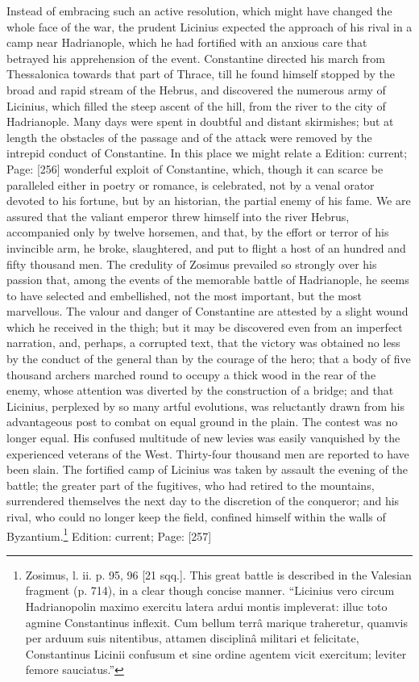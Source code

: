 Instead of embracing such an active resolution, which might have changed the whole face of the war, the prudent Licinius expected the approach of his rival in a camp near Hadrianople, which he had fortified with an anxious care that betrayed his apprehension of the event. Constantine directed his march from Thessalonica towards that part of Thrace, till he found himself stopped by the broad and rapid stream of the Hebrus, and discovered the numerous army of Licinius, which filled the steep ascent of the hill, from the river to the city of Hadrianople. Many days were spent in doubtful and distant skirmishes; but at length the obstacles of the passage and of the attack were removed by the intrepid conduct of Constantine. In this place we might relate a Edition: current; Page: [256] wonderful exploit of Constantine, which, though it can scarce be paralleled either in poetry or romance, is celebrated, not by a venal orator devoted to his fortune, but by an historian, the partial enemy of his fame. We are assured that the valiant emperor threw himself into the river Hebrus, accompanied only by twelve horsemen, and that, by the effort or terror of his invincible arm, he broke, slaughtered, and put to flight a host of an hundred and fifty thousand men. The credulity of Zosimus prevailed so strongly over his passion that, among the events of the memorable battle of Hadrianople, he seems to have selected and embellished, not the most important, but the most marvellous. The valour and danger of Constantine are attested by a slight wound which he received in the thigh; but it may be discovered even from an imperfect narration, and, perhaps, a corrupted text, that the victory was obtained no less by the conduct of the general than by the courage of the hero; that a body of five thousand archers marched round to occupy a thick wood in the rear of the enemy, whose attention was diverted by the construction of a bridge; and that Licinius, perplexed by so many artful evolutions, was reluctantly drawn from his advantageous post to combat on equal ground in the plain. The contest was no longer equal. His confused multitude of new levies was easily vanquished by the experienced veterans of the West. Thirty-four thousand men are reported to have been slain. The fortified camp of Licinius was taken by assault the evening of the battle; the greater part of the fugitives, who had retired to the mountains, surrendered themselves the next day to the discretion of the conqueror; and his rival, who could no longer keep the field, confined himself within the walls of Byzantium.\footnote{Zosimus, l. ii. p. 95, 96 [21 sqq.]. This great battle is described in the Valesian fragment (p. 714), in a clear though concise manner. \texthebrew{“}Licinius vero circum Hadrianopolin maximo exercitu latera ardui montis impleverat: illuc toto agmine Constantinus inflexit. Cum bellum terrâ marique traheretur, quamvis per arduum suis nitentibus, attamen disciplinâ militari et felicitate, Constantinus Licinii confusum et sine ordine agentem vicit exercitum; leviter femore sauciatus.\texthebrew{}”}
Edition: current; Page: [257]

